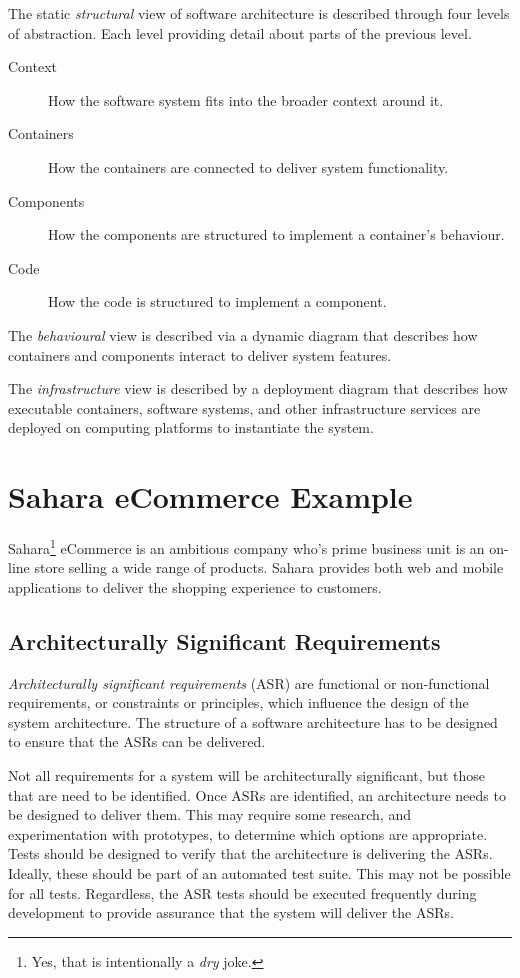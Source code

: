 \newpage
The static \emph{structural} view of software architecture is described through four levels of abstraction.
Each level providing detail about parts of the previous level.
\begin{description}
    \item[Context] How the software system fits into the broader context around it.
    \item[Containers] How the containers are connected to deliver system functionality.
    \item[Components] How the components are structured to implement a container's behaviour.
    \item[Code] How the code is structured to implement a component.
\end{description}

The \emph{behavioural} view is described via a dynamic diagram that describes how
containers and components interact to deliver system features.

The \emph{infrastructure} view is described by a deployment diagram that describes how
executable containers, software systems, and other infrastructure services are
deployed on computing platforms to instantiate the system.


\section{Sahara eCommerce Example}\label{sec:storeExample}
Sahara\footnote{Yes, that is intentionally a \textit{dry} joke.} eCommerce is an ambitious company who's prime business unit is an on-line store selling a wide range of products.
Sahara provides both web and mobile applications to deliver the shopping experience to customers.

\subsection{Architecturally Significant Requirements}\label{sec:storeReq}
\emph{Architecturally significant requirements} (ASR) are functional or non-functional requirements,
or constraints or principles, which influence the design of the system architecture.
The structure of a software architecture has to be designed to ensure that the ASRs can be delivered.

Not all requirements for a system will be architecturally significant, but those that are need to be identified.
Once ASRs are identified, an architecture needs to be designed to deliver them.
This may require some research, and experimentation with prototypes, to determine which options are appropriate.
Tests should be designed to verify that the architecture is delivering the ASRs.
Ideally, these should be part of an automated test suite.
This may not be possible for all tests.
Regardless, the ASR tests should be executed frequently during development to provide assurance that the system will deliver the ASRs.

